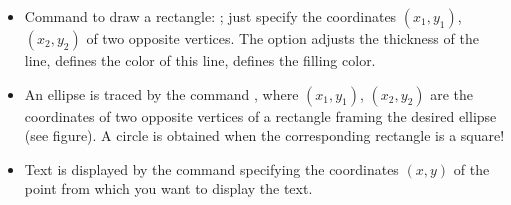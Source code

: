 \documentclass[11pt,class=report,crop=false]{standalone}
\begin{document}
\begin{cours}
\begin{itemize}
  \item Command to draw a rectangle: ; just specify the coordinates $(x_1,y_1)$, $(x_2,y_2)$ of two opposite vertices. The option  adjusts the thickness of the line,  defines the color of this line,  defines the filling color.
  
  \item An ellipse is traced by the command , where $(x_1,y_1)$, $(x_2,y_2)$ are the coordinates of two opposite vertices of a rectangle framing the desired ellipse (see figure). A circle is obtained when the corresponding rectangle is a square!  
  
  \item Text is displayed by the command  specifying the coordinates $(x,y)$ of the point from which you want to display the text. 
  
\end{itemize}


\end{cours}


\end{document}
